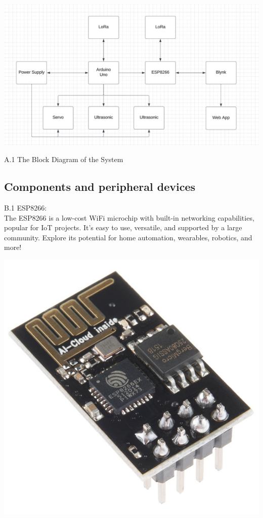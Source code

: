 \documentclass[conference, onecolumn]{IEEEtran}
\begin{document}
\begin{center}
\centerline{\includegraphics[width=3.8 in]{Block_diagram.png}}
A.1 The Block Diagram of the System
\end{center}



\subsection{Components and peripheral devices}

B.1 ESP8266:\\
The ESP8266 is a low-cost WiFi microchip with built-in networking capabilities, popular for IoT projects. It's easy to use, versatile, and supported by a large community. Explore its potential for home automation, wearables, robotics, and more!\\
\centerline{\includegraphics[width=3.8 in]{esp8266}}\\
\end{document}
